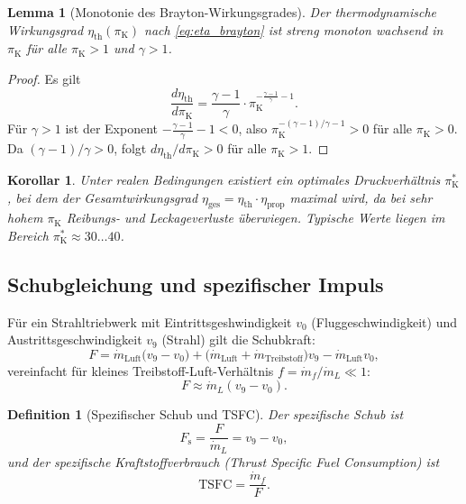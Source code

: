 ﻿\documentclass[12pt,a4paper]{article}
\newtheorem{lemma}[theorem]{Lemma}
\newtheorem{korollar}[theorem]{Korollar}
\newtheorem{definition}[theorem]{Definition}
\theoremstyle{remark}
\newcommand{\piK}{\pi_{\mathrm{K}}}
\newcommand{\etath}{\eta_{\mathrm{th}}}
\newcommand{\etaprop}{\eta_{\mathrm{prop}}}
\newcommand{\etages}{\eta_{\mathrm{ges}}}
\newcommand{\Fs}{F_{\mathrm{s}}}
\newcommand{\TSFC}{\mathrm{TSFC}}
\begin{document}
\begin{lemma}[Monotonie des Brayton-Wirkungsgrades]
\label{lem:mono}
Der thermodynamische Wirkungsgrad $\etath(\piK)$ nach \eqref{eq:eta_brayton}
ist streng monoton wachsend in $\piK$ f\"ur alle $\piK > 1$ und $\gamma > 1$.
\end{lemma}
\begin{proof}
Es gilt
\[
  \frac{d\etath}{d\piK}
    = \frac{\gamma-1}{\gamma} \cdot \piK^{-\frac{\gamma-1}{\gamma}-1}.
\]
F\"ur $\gamma > 1$ ist der Exponent $-\frac{\gamma-1}{\gamma}-1 < 0$, also
$\piK^{-(\gamma-1)/\gamma - 1} > 0$ f\"ur alle $\piK > 0$.
Da $(\gamma-1)/\gamma > 0$, folgt $d\etath/d\piK > 0$ f\"ur alle $\piK > 1$.
\end{proof}

\begin{korollar}
\label{cor:piopt}
Unter realen Bedingungen existiert ein optimales Druckverh\"altnis $\piK^*$,
bei dem der Gesamtwirkungsgrad $\etages = \etath \cdot \etaprop$ maximal wird,
da bei sehr hohem $\piK$ Reibungs- und Leckage\-verluste \"uberwiegen.
Typische Werte liegen im Bereich $\piK^* \approx 30\ldots 40$.
\end{korollar}

\subsection{Schubgleichung und spezifischer Impuls}

F\"ur ein Strahltriebwerk mit Eintrittsgeshwindigkeit $v_0$ (Fluggeschwindigkeit)
und Austrittsgeschwindigkeit $v_9$ (Strahl) gilt die Schubkraft:
\begin{equation}
  F = \dot{m}_{\mathrm{Luft}} \bigl(v_9 - v_0\bigr)
    + \bigl(\dot{m}_{\mathrm{Luft}} + \dot{m}_{\mathrm{Treibstoff}}\bigr) v_9
    - \dot{m}_{\mathrm{Luft}} v_0,
  \label{eq:schub}
\end{equation}
vereinfacht f\"ur kleines Treibstoff-Luft-Verh\"altnis $f = \dot{m}_f / \dot{m}_L \ll 1$:
\begin{equation}
  F \approx \dot{m}_L (v_9 - v_0).
\end{equation}

\begin{definition}[Spezifischer Schub und TSFC]
Der spezifische Schub ist
\[
  \Fs = \frac{F}{\dot{m}_L} = v_9 - v_0,
\]
und der spezifische Kraftstoffverbrauch (Thrust Specific Fuel Consumption) ist
\[
  \TSFC = \frac{\dot{m}_f}{F}.
\]
\end{definition}
\end{document}

